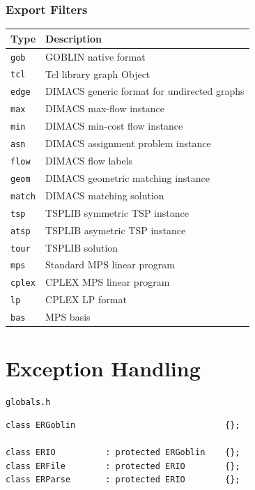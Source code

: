 \documentclass[a4paper,11pt,twoside]{book}
\begin{document}
\begin{multicols}{2}
\subsection{Export Filters}
\bigskip
\begin{center}
\begin{tabular}{|p{2.1cm}|p{10.1cm}|}
\hline
{\bf Type}       & {\bf Description} \\
\hline
\hline
\verb/gob/   & GOBLIN native format \\
\verb/tcl/   & Tcl library graph Object \\
\verb/edge/  & DIMACS generic format for undirected graphs \\
\verb/max/   & DIMACS max-flow instance \\
\verb/min/   & DIMACS min-cost flow instance \\
\verb/asn/   & DIMACS assignment problem instance \\
\verb/flow/  & DIMACS flow labels \\
\verb/geom/  & DIMACS geometric matching instance \\
\verb/match/ & DIMACS matching solution \\
\verb/tsp/   & TSPLIB symmetric TSP instance \\
\verb/atsp/  & TSPLIB asymetric TSP instance \\
\verb/tour/  & TSPLIB solution \\
\verb/mps/   & Standard MPS linear program \\
\verb/cplex/ & CPLEX MPS linear program \\
\verb/lp/    & CPLEX LP format \\
\verb/bas/   & MPS basis \\
\hline
\end{tabular}
\end{center}



\cleardoublepage
{}
\chapter{Exception Handling}
\thispagestyle{fancy}
\label{clb9}
\myinclude\verb/globals.h/
\begin{mymethods}
\begin{verbatim}
class ERGoblin                              {};

class ERIO          : protected ERGoblin    {};
class ERFile        : protected ERIO        {};
class ERParse       : protected ERIO        {};


\end{verbatim}
\end{mymethods}
\end{multicols}
\end{document}
